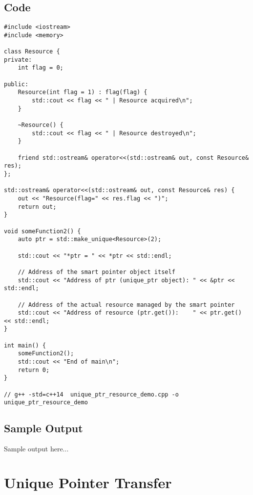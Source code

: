 \documentclass[12pt]{article}
\begin{document}
\subsection*{Code}
\begin{Verbatim}[fontsize=\small,frame=single]
#include <iostream>
#include <memory>

class Resource {
private:
    int flag = 0;

public:
    Resource(int flag = 1) : flag(flag) {
        std::cout << flag << " | Resource acquired\n";
    }

    ~Resource() {
        std::cout << flag << " | Resource destroyed\n";
    }

    friend std::ostream& operator<<(std::ostream& out, const Resource& res);
};

std::ostream& operator<<(std::ostream& out, const Resource& res) {
    out << "Resource(flag=" << res.flag << ")";
    return out;
}

void someFunction2() {
    auto ptr = std::make_unique<Resource>(2);

    std::cout << "*ptr = " << *ptr << std::endl;

    // Address of the smart pointer object itself
    std::cout << "Address of ptr (unique_ptr object): " << &ptr << std::endl;

    // Address of the actual resource managed by the smart pointer
    std::cout << "Address of resource (ptr.get()):    " << ptr.get() << std::endl;
}

int main() {
    someFunction2();
    std::cout << "End of main\n";
    return 0;
}

// g++ -std=c++14  unique_ptr_resource_demo.cpp -o unique_ptr_resource_demo
\end{Verbatim}

\subsection*{Sample Output}
\begin{tcolorbox}[colback=black!5!white,colframe=black!75!white]
Sample output here...
\end{tcolorbox}
\newpage

\section*{Unique Pointer Transfer}
\end{document}
